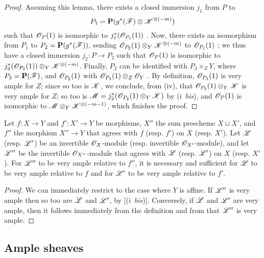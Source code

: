 \begin{proof}
Assuming this lemma, there exists a closed immersion $j_1$ from $P$ to
\[
  P_1 = \mathbf{P}(g^*(\mathscr{F})\otimes\mathscr{K}^{\otimes(-m)})
\]
such that $\mathscr{O}_P(1)$ is isomorphic to $j_1^*(\mathscr{O}_{P_1}(1))$ .
Now, there exists an isomorphism from $P_1$ to $P_2=\mathbf{P}(g^*(\mathscr{F}))$, sending $\mathscr{O}_{P_2}(1)\otimes_Y\mathscr{K}^{\otimes(-m)}$ to $\mathscr{O}_{P_1}(1)$ ;
we thus have a closed immersion $j_2:P\to P_2$ such that $\mathscr{O}_P(1)$ is isomorphic to $j_2^*(\mathscr{O}_{P_2}(1))\otimes_Y\mathscr{K}^{\otimes(-m)}$.
Finally, $P_2$ can be identified with $P_3\times_Z Y$, where $P_3=\mathbf{P}(\mathscr{F})$, and $\mathscr{O}_{P_2}(1)$ with $\mathscr{O}_{P_3}(1)\otimes_Z\mathscr{O}_Y$ .
By definition, $\mathscr{O}_{P_3}(1)$ is very ample for $Z$;
since so too is $\mathscr{K}$, we conclude, from (iv), that $\mathscr{O}_{P_2}(1)\otimes_Y\mathscr{K}$ is very ample for $Z$;
so too is $\mathscr{M}=j_2^*(\mathscr{O}_{P_2}(1)\otimes_Y\mathscr{K})$ by (i~\emph{bis}), and $\mathscr{O}_P(1)$ is isomorphic to $\mathscr{M}\otimes_Y\mathscr{K}^{\otimes(-m-1)}$, which finishes the proof.
\end{proof}

\begin{proposition}[4.4.11]
\label{II.4.4.11}
Let $f:X\to Y$ and $f':X'\to Y$ be morphisms, $X''$ the sum prescheme $X\sqcup X'$, and $f''$ the morphism $X''\to Y$ that agrees with $f$ (resp. $f'$) on $X$ (resp. $X'$).
Let $\mathscr{L}$ (resp. $\mathscr{L}'$) be an invertible $\mathscr{O}_X$-module (resp. invertible $\mathscr{O}_{X'}$-module), and let $\mathscr{L}''$ be the invertible $\mathscr{O}_{X''}$-module that agrees with $\mathscr{L}$ (resp. $\mathscr{L}'$) on $X$ (resp. $X'$).
For $\mathscr{L}''$ to be very ample relative to $f''$, it is necessary and sufficient for $\mathscr{L}$ to be very ample relative to $f$ and for $\mathscr{L}'$ to be very ample relative to $f'$.
\end{proposition}

\begin{proof}
We can immediately restrict to the case where $Y$ is affine.
If $\mathscr{L}''$ is very ample then so too are $\mathscr{L}$ and $\mathscr{L}'$, by [(i~\emph{bis})].
Conversely, if $\mathscr{L}$ and $\mathscr{L}'$ are very ample, then it follows immediately from the definition  and from  that $\mathscr{L}''$ is very ample.
\end{proof}


\subsection{Ample sheaves}
\label{subsection:II.4.5}

